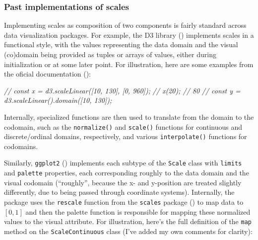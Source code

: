 \documentclass[
]{book}
\newenvironment{Shaded}{\begin{snugshade}}{\end{snugshade}}
\newcommand{\CommentTok}[1]{\textcolor[rgb]{0.56,0.35,0.01}{\textit{#1}}}
\theoremstyle{definition}
\theoremstyle{definition}
\theoremstyle{definition}
\theoremstyle{definition}
\theoremstyle{remark}
\begin{document}
\subsubsection{Past implementations of scales}\label{past-implementations-of-scales}

Implementing scales as composition of two components is fairly standard across data visualization packages. For example, the D3 library () implements scales in a functional style, with the values representing the data domain and the visual (co)domain being provided as tuples or arrays of values, either during initialization or at some later point. For illustration, here are some examples from the oficial documentation ():

\begin{Shaded}
\begin{Highlighting}[]
\CommentTok{// const x = d3.scaleLinear([10, 130], [0, 960]);}
\CommentTok{// x(20); // 80}
\CommentTok{// const y = d3.scaleLinear().domain([10, 130]);}
\end{Highlighting}
\end{Shaded}

Internally, specialized functions are then used to translate from the domain to the codomain, such as the \texttt{normalize()} and \texttt{scale()} functions for continuous and discrete/ordinal domains, respectively, and various \texttt{interpolate()} functions for codomains.

Similarly, \texttt{ggplot2} () implements each subtype of the \texttt{Scale} class with \texttt{limits} and \texttt{palette} properties, each corresponding roughly to the data domain and the visual codomain (``roughly'', because the x- and y-position are treated slightly differently, due to being passed through coordinate systems). Internally, the package uses the \texttt{rescale} function from the \texttt{scales} package () to map data to \([0, 1]\) and then the palette function is responsible for mapping these normalized values to the visual attribute. For illustration, here's the full definition of the \texttt{map} method on the \texttt{ScaleContinuous} class (I've added my own comments for clarity):
\end{document}
